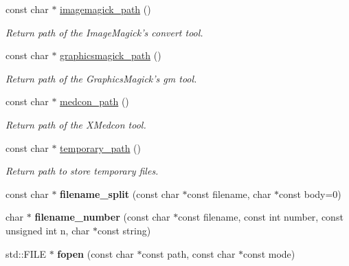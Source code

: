 \begin{DoxyCompactItemize}
\item 
const char $\ast$ \hyperlink{namespacecimg__library_1_1cimg_a66b97c48fa2e598dd3818152cca7e4f0}{imagemagick\-\_\-path} ()
\begin{DoxyCompactList}\small\item\em Return path of the Image\-Magick's {\ttfamily convert} tool. \end{DoxyCompactList}\item 
const char $\ast$ \hyperlink{namespacecimg__library_1_1cimg_a427f31124296fa11e951bb2536e4e88b}{graphicsmagick\-\_\-path} ()
\begin{DoxyCompactList}\small\item\em Return path of the Graphics\-Magick's {\ttfamily gm} tool. \end{DoxyCompactList}\item 
const char $\ast$ \hyperlink{namespacecimg__library_1_1cimg_a9ab62b36cd320543e0b0ab830252cb10}{medcon\-\_\-path} ()
\begin{DoxyCompactList}\small\item\em Return path of the {\ttfamily X\-Medcon} tool. \end{DoxyCompactList}\item 
const char $\ast$ \hyperlink{namespacecimg__library_1_1cimg_a411c598d6a44291415a1e2299d2c39b1}{temporary\-\_\-path} ()
\begin{DoxyCompactList}\small\item\em Return path to store temporary files. \end{DoxyCompactList}\item 
\hypertarget{namespacecimg__library_1_1cimg_aaff7e5c864061caac3ef4cc2602ec273}{const char $\ast$ {\bfseries filename\-\_\-split} (const char $\ast$const filename, char $\ast$const body=0)}\label{namespacecimg__library_1_1cimg_aaff7e5c864061caac3ef4cc2602ec273}

\item 
\hypertarget{namespacecimg__library_1_1cimg_ae0e40e3945809b622dad64752fb31ea2}{char $\ast$ {\bfseries filename\-\_\-number} (const char $\ast$const filename, const int number, const unsigned int n, char $\ast$const string)}\label{namespacecimg__library_1_1cimg_ae0e40e3945809b622dad64752fb31ea2}

\item 
\hypertarget{namespacecimg__library_1_1cimg_a19ad60edf05bad32e75b7077509ef566}{std\-::\-F\-I\-L\-E $\ast$ {\bfseries fopen} (const char $\ast$const path, const char $\ast$const mode)}\label{namespacecimg__library_1_1cimg_a19ad60edf05bad32e75b7077509ef566}


\end{DoxyCompactItemize}
